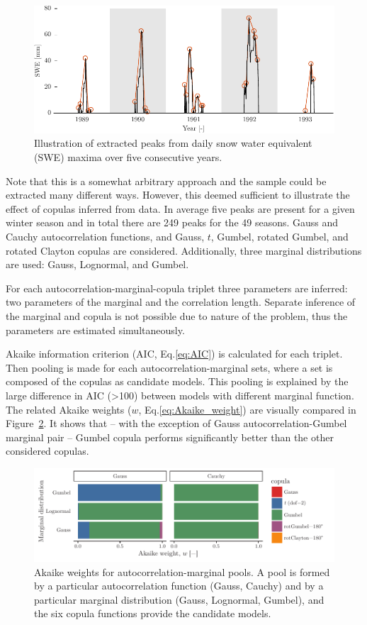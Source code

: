 \begin{figure}[htbp!] 
	\centering    
	\includegraphics[]{sample_&_peaks.pdf}
	\caption{Illustration of extracted peaks from daily snow water equivalent (SWE) maxima over five consecutive years.}
	\label{fig:peak_sample_ex3}
\end{figure}

Note that this is a somewhat arbitrary approach and the sample could be extracted many different ways. However, this deemed sufficient to illustrate the effect of copulas inferred from data. In average five peaks are present for a given winter season and in total there are 249 peaks for the 49 seasons. Gauss and Cauchy autocorrelation functions, and Gauss, $t$, Gumbel, rotated Gumbel, and rotated Clayton copulas are considered. Additionally, three marginal distributions are used: Gauss, Lognormal, and Gumbel.

For each autocorrelation-marginal-copula triplet three parameters are inferred: two parameters of the marginal and the correlation length. Separate inference of the marginal and copula is not possible due to nature of the problem, thus the parameters are estimated simultaneously.

Akaike information criterion (AIC, Eq.\ref{eq:AIC}) is calculated for each triplet. Then pooling is made for each autocorrelation-marginal sets, where a set is composed of the copulas as candidate models. This pooling is explained by the large difference in AIC (>100) between models with different marginal function. The related Akaike weights ($w$, Eq.\ref{eq:Akaike_weight}) are visually compared in Figure~\ref{fig:akaike_ex3}. It shows that -- with the exception of Gauss autocorrelation-Gumbel marginal pair -- Gumbel copula performs significantly better than the other considered copulas.

\begin{figure}[htbp!] 
	\centering    
	\includegraphics[]{akaike_weights.pdf}
	\caption{Akaike weights for autocorrelation-marginal pools. A pool is formed by a particular autocorrelation function (Gauss, Cauchy) and by a particular marginal distribution (Gauss, Lognormal, Gumbel), and the six copula functions provide the candidate models.}
	\label{fig:akaike_ex3}
\end{figure}


